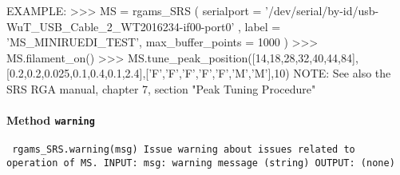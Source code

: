 {\newline
EXAMPLE:\newline
>>> MS = rgams_SRS ( serialport = '/dev/serial/by-id/usb-WuT_USB_Cable_2_WT2016234-if00-port0' , label = 'MS_MINIRUEDI_TEST', max_buffer_points = 1000 )\newline
>>> MS.filament_on()\newline
>>> MS.tune_peak_position([14,18,28,32,40,44,84],[0.2,0.2,0.025,0.1,0.4,0.1,2.4],['F','F','F','F','F','M','M'],10)\newline
\newline
NOTE:\newline
See also the SRS RGA manual, chapter 7, section "Peak Tuning Procedure"\newline
\newline
}

\paragraph{Method \texttt{warning}}
\vspace{1ex}
\texttt{\newline
rgams_SRS.warning(msg)\newline
\newline
Issue warning about issues related to operation of MS.\newline
\newline
INPUT:\newline
msg: warning message (string)\newline
\newline
OUTPUT:\newline
(none)\newline
\newline
}

